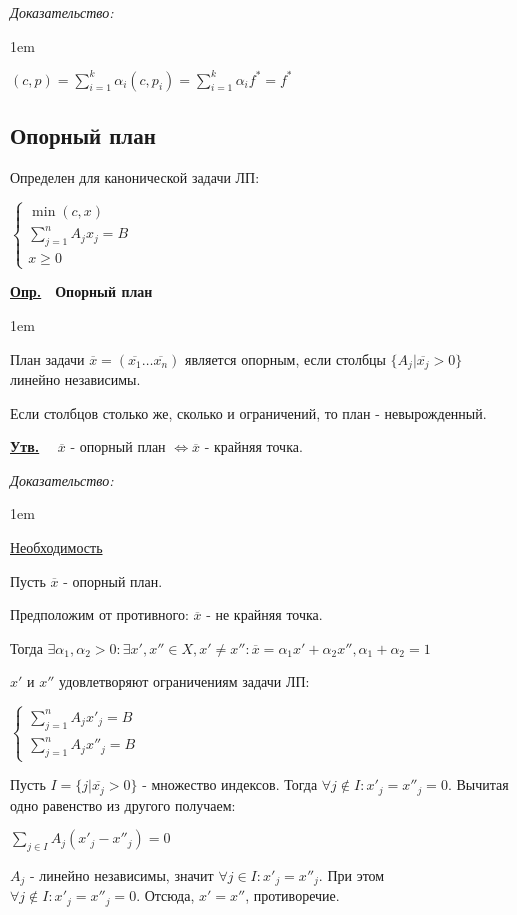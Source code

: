 \documentclass[11pt]{article}
\newenvironment{df}[1]{
  \underline{\textbf{Опр.}}\ \ \textbf{#1}
  
  \begin{adjustwidth}{1em}{}
}{
  \end{adjustwidth}
}
\newenvironment{proof}{
  \textit{Доказательство:}
    
  \begin{adjustwidth}{1em}{}
}{
  \end{adjustwidth}
}
\newenvironment{statement}{
  \underline{\textbf{Утв.}}\ \ }{
  
}
\begin{document}
\begin{sloppypar}
\begin{proof}
  $(c, p) = \sum_{i = 1}^k \alpha_i (c, p_i) = \sum_{i = 1}^k \alpha_i f^* = f^*$
\end{proof}

\subsection*{Опорный план}
Определен для канонической задачи ЛП:

$\begin{cases}
  \min (c, x) \\
  \sum_{j = 1}^n A_j x_j = B \\
  x \geq 0
\end{cases}$

\begin{df}{Опорный план}
  План задачи $\overline{x} = (\overline{x_1} \dots \overline{x_n})$ является опорным, если столбцы $\{A_j | \overline{x_j} > 0\}$ линейно независимы.
  
  Если столбцов столько же, сколько и ограничений, то план - невырожденный.
\end{df}

\begin{statement}
  $\overline{x}$ - опорный план $\Longleftrightarrow \overline{x}$ - крайняя точка. 
\end{statement}
\begin{proof}
\underline{Необходимость}

Пусть $\overline{x}$ - опорный план.

Предположим от противного: $\overline{x}$ - не крайняя точка.

Тогда $\exists \alpha_1, \alpha_2 > 0: \exists x', x'' \in X, x' \neq x'': \overline{x} = \alpha_1 x' + \alpha_2 x'', \alpha_1 + \alpha_2 = 1$

$x'$ и $x''$ удовлетворяют ограничениям задачи ЛП:

$\begin{cases}
  \sum_{j = 1}^n A_j x'_j = B \\
  \sum_{j = 1}^n A_j x''_j = B
\end{cases}$

Пусть $I = \{j | \overline{x_j} > 0\}$ - множество индексов. Тогда $\forall j \notin I: x'_j = x''_j = 0$. Вычитая одно равенство из другого получаем:

$\sum_{j \in I} A_j (x'_j - x''_j) = 0$

$A_j$ - линейно независимы, значит $\forall j \in I: x'_j = x''_j$. При этом $\forall j \notin I: x'_j = x''_j = 0$. Отсюда, $x' = x''$, противоречие.\\~\\


\end{proof}
\end{sloppypar}
\end{document}
